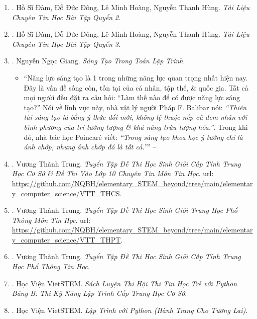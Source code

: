 \documentclass{article}
\begin{document}
\begin{enumerate}
	\item \cite{TL_chuyen_Tin_BT_quyen_2}. {\sc Hồ Sĩ Đàm, Đỗ Đức Đông, Lê Minh Hoàng, Nguyễn Thanh Hùng}. {\it Tài Liệu Chuyên Tin Học Bài Tập Quyển 2}.\hfill{\sf[reading]}

	\item \cite{TL_chuyen_Tin_BT_quyen_3}. {\sc Hồ Sĩ Đàm, Đỗ Đức Đông, Lê Minh Hoàng, Nguyễn Thanh Hùng}. {\it Tài Liệu Chuyên Tin Học Bài Tập Quyển 3}.\hfill{\sf[reading]}

	\item \cite{Giang_sang_tao_lap_trinh}. {\sc Nguyễn Ngọc Giang}. {\it Sáng Tạo Trong Toán Lập Trình}.
	\begin{itemize}
		\item ``Năng lực sáng tạo là 1 trong những năng lực quan trọng nhất hiện nay. Đây là vấn đề sống còn, tồn tại của cá nhân, tập thể, \& quốc gia. Tất cả mọi người đều đặt ra câu hỏi: ``Làm thế nào để có được năng lực sáng tạo?'' Nói về lĩnh vực này, nhà vật lý người Pháp F. Balibar nói: {\it``Thiên tài sáng tạo là bằng ý thức đổi mới, không lệ thuộc nếp cũ đem nhân với bình phương của trí tưởng tượng \& khả năng trừu tượng hóa.''}. Trong khi đó, nhà bác học Poincar\'e viết: {\it``Trong sáng tạo khoa học ý tưởng chỉ là ánh chớp, nhưng ánh chớp đó là tất cả.''}'' -- \cite[Lời nói đầu]{Giang_sang_tao_lap_trinh}
	\end{itemize}

	\item \cite{Trung_THCS_Tin}. Vương Thành Trung. {\it Tuyển Tập Đề Thi Học Sinh Giỏi Cấp Tỉnh Trung Học Cơ Sở \& Đề Thi Vào Lớp 10 Chuyên Tin Môn Tin Học}. {\sc url}: \url{https://github.com/NQBH/elementary_STEM_beyond/tree/main/elementary_computer_science/VTT_THCS}.\hfill{\sf[reading]}

	\item \cite{Trung_THPT_Tin}. Vương Thành Trung. {\it Tuyển Tập Đề Thi Học Sinh Giỏi Trung Học Phổ Thông Môn Tin Học}. {\sc url}: \url{https://github.com/NQBH/elementary_STEM_beyond/tree/main/elementary_computer_science/VTT_THPT}.\hfill{\sf[reading]}

	\item \cite{Trung_HSG_THPT_Tin}. Vương Thành Trung. {\it Tuyển Tập Đề Thi Học Sinh Giỏi Cấp Tỉnh Trung Học Phổ Thông Tin Học}.\hfill{\sf[reading]}

	\item \cite{VietSTEM2021}. Học Viện VietSTEM. {\it Sách Luyện Thi Hội Thi Tin Học Trẻ  với Python Bảng B: Thi Kỹ Năng Lập Trình Cấp Trung Học Cơ Sở}.\hfill{\sf[reading]}

	\item \cite{VietSTEM2022}. Học Viện VietSTEM. {\it Lập Trình với Python (Hành Trang Cho Tương Lai)}.\hfill{\sf[done]}
\end{enumerate}
\end{document}
